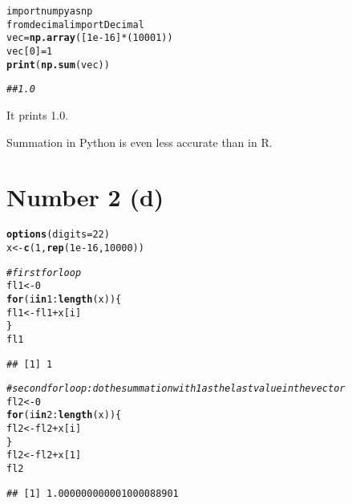 \documentclass[english]{article}\usepackage[]{graphicx}\usepackage[]{color}
\makeatletter
\newcommand{\hlnum}[1]{\textcolor[rgb]{0.686,0.059,0.569}{#1}}%
\newcommand{\hlcom}[1]{\textcolor[rgb]{0.678,0.584,0.686}{\textit{#1}}}%
\newcommand{\hlopt}[1]{\textcolor[rgb]{0,0,0}{#1}}%
\newcommand{\hlstd}[1]{\textcolor[rgb]{0.345,0.345,0.345}{#1}}%
\newcommand{\hlkwa}[1]{\textcolor[rgb]{0.161,0.373,0.58}{\textbf{#1}}}%
\newcommand{\hlkwb}[1]{\textcolor[rgb]{0.69,0.353,0.396}{#1}}%
\newcommand{\hlkwc}[1]{\textcolor[rgb]{0.333,0.667,0.333}{#1}}%
\newcommand{\hlkwd}[1]{\textcolor[rgb]{0.737,0.353,0.396}{\textbf{#1}}}%
\newenvironment{kframe}{%
 \def\at@end@of@kframe{}%
 \ifinner\ifhmode%
  \def\at@end@of@kframe{\end{minipage}}%
  \begin{minipage}{\columnwidth}%
 \fi\fi%
 \def\FrameCommand##1{\hskip\@totalleftmargin \hskip-\fboxsep
 \colorbox{shadecolor}{##1}\hskip-\fboxsep
     \hskip-\linewidth \hskip-\@totalleftmargin \hskip\columnwidth}%
 \MakeFramed {\advance\hsize-\width
   \@totalleftmargin\z@ \linewidth\hsize
   \@setminipage}}%
 {\par\unskip\endMakeFramed%
 \at@end@of@kframe}
\newenvironment{knitrout}{}{} %
\makeatother
\begin{document}
\begin{knitrout}
\color{fgcolor}\begin{kframe}
\begin{alltt}
import numpy as np 
from decimal import Decimal
vec=\hlkwd{np.array}([1e-16]*(10001)) 
vec[0]=1 
\hlkwd{print} (\hlkwd{np.sum}(vec))

\hlcom{## 1.0}
\end{alltt}
\end{kframe}
\end{knitrout}

It prints 1.0.

Summation in Python is even less accurate than in R.


\section*{Number 2 (d)}

\begin{knitrout}
\color{fgcolor}\begin{kframe}
\begin{alltt}
\hlkwd{options}\hlstd{(}\hlkwc{digits}\hlstd{=}\hlnum{22}\hlstd{)}
\hlstd{x} \hlkwb{<-} \hlkwd{c}\hlstd{(}\hlnum{1}\hlstd{,} \hlkwd{rep}\hlstd{(}\hlnum{1e-16}\hlstd{,} \hlnum{10000}\hlstd{))}

\hlcom{# first for loop}
\hlstd{fl1} \hlkwb{<-} \hlnum{0}
\hlkwa{for} \hlstd{(i} \hlkwa{in} \hlnum{1}\hlopt{:}\hlkwd{length}\hlstd{(x)) \{}
  \hlstd{fl1} \hlkwb{<-} \hlstd{fl1} \hlopt{+} \hlstd{x[i]}
\hlstd{\}}
\hlstd{fl1}
\end{alltt}
\begin{verbatim}
## [1] 1
\end{verbatim}
\begin{alltt}
\hlcom{# second for loop: do the summation with 1 as the last value in the vector}
\hlstd{fl2} \hlkwb{<-} \hlnum{0}
\hlkwa{for} \hlstd{(i} \hlkwa{in} \hlnum{2}\hlopt{:}\hlkwd{length}\hlstd{(x)) \{}
  \hlstd{fl2} \hlkwb{<-} \hlstd{fl2} \hlopt{+} \hlstd{x[i]}
\hlstd{\}}
\hlstd{fl2} \hlkwb{<-} \hlstd{fl2} \hlopt{+} \hlstd{x[}\hlnum{1}\hlstd{]}
\hlstd{fl2}
\end{alltt}
\begin{verbatim}
## [1] 1.000000000001000088901
\end{verbatim}
\end{kframe}
\end{knitrout}
\end{document}
